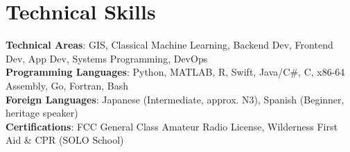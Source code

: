 \documentclass[letterpaper, 11pt]{article}
\begin{document}
	\section{Technical Skills}
	\begin{itemize}[leftmargin=0.15in, label={}]
          \small{\item{
              \textbf{Technical Areas}{: GIS, Classical Machine Learning, Backend Dev, Frontend Dev, App Dev, Systems Programming, DevOps} \\
              \textbf{Programming Languages}{: Python, MATLAB, R, Swift, Java/C\#, C, x86-64 Assembly, Go, Fortran, Bash} \\
              \textbf{Foreign Languages}{: Japanese (Intermediate, approx. N3), Spanish (Beginner, heritage speaker)} \\
              \textbf{Certifications}{: FCC General Class Amateur Radio License, Wilderness First Aid \& CPR (SOLO School)} }}
	\end{itemize}  
\end{document}
